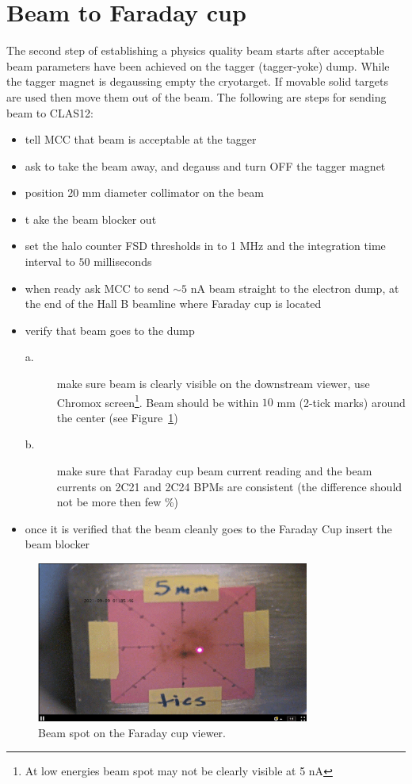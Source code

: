 \clearpage
\section{Beam to Faraday cup}
\indent

The second step of establishing a physics quality beam starts after acceptable beam parameters have been achieved on the tagger (tagger-yoke) dump. While the tagger magnet is degaussing empty the cryotarget. If movable solid targets are used then move them out of the beam. 
The following are steps for sending beam to CLAS12:
\begin{itemize}
\item tell MCC that beam is acceptable at the tagger
\item ask to take the beam away, and degauss and turn OFF the tagger magnet 
\item position $20$ mm diameter collimator on the beam 
\item t ake the beam blocker out
\item set the halo counter FSD thresholds in to 1 MHz and the integration time interval to $50$ milliseconds
\item when ready ask MCC to send $\sim 5$ nA beam straight to the electron dump, at the end of the Hall B beamline where Faraday cup is located 
\item verify that beam goes to the dump 
\begin{description}
\item[a.] make sure beam is clearly visible on the downstream viewer, use Chromox screen\footnote{At low energies beam spot may not be clearly visible at 5 nA}. Beam should be within $10$ mm (2-tick marks) around the center (see Figure~\ref{fig:FC_spot})
\item[b.] make sure that Faraday cup beam current reading and the beam currents on 2C21 and 2C24 BPMs are consistent (the difference  should not be more then few \%)
\end{description}
\item once it is verified that the beam cleanly goes to the Faraday Cup insert the beam blocker 
\end{itemize}
\begin{figure}[htb!]
\centering
\includegraphics[width=0.8\textwidth]{FC_viewer.pdf}
\caption{Beam spot on the Faraday cup viewer.}
\label{fig:FC_spot}
\end{figure}

